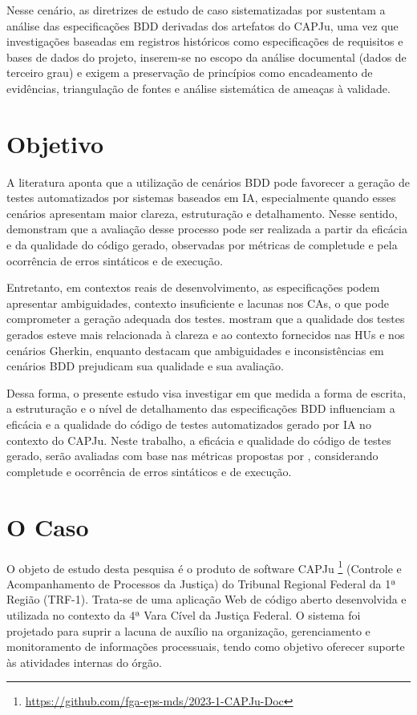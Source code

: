 Nesse cenário, as diretrizes de estudo de caso sistematizadas por  sustentam a análise das especificações BDD derivadas dos artefatos do CAPJu, uma vez que investigações baseadas em registros históricos como especificações de requisitos e bases de dados do projeto, inserem-se no escopo da análise documental (dados de terceiro grau) e exigem a preservação de princípios como encadeamento de evidências, triangulação de fontes e análise sistemática de ameaças à validade.

\section{Objetivo}

A literatura aponta que a utilização de cenários BDD pode favorecer a geração de testes automatizados por sistemas baseados em IA, especialmente quando esses cenários apresentam maior clareza, estruturação e detalhamento. Nesse sentido,  demonstram que a avaliação desse processo pode ser realizada a partir da eficácia e da qualidade do código gerado, observadas por métricas de completude e pela ocorrência de erros sintáticos e de execução.

Entretanto, em contextos reais de desenvolvimento, as especificações podem apresentar ambiguidades, contexto insuficiente e lacunas nos CAs, o que pode comprometer a geração adequada dos testes.  mostram que a qualidade dos testes gerados esteve mais relacionada à clareza e ao contexto fornecidos nas HUs e nos cenários Gherkin, enquanto  destacam que ambiguidades e inconsistências em cenários BDD prejudicam sua qualidade e sua avaliação.

Dessa forma, o presente estudo visa investigar em que medida a forma de escrita, a estruturação e o nível de detalhamento das especificações BDD influenciam a eficácia e a qualidade do código de testes automatizados gerado por IA no contexto do CAPJu. Neste trabalho, a eficácia e qualidade do código de testes gerado, serão avaliadas com base nas métricas propostas por , considerando completude e  ocorrência de erros sintáticos e de execução.

\section{O Caso}
\label{sec:caso}

O objeto de estudo desta pesquisa é o produto de software CAPJu \footnote{\url{https://github.com/fga-eps-mds/2023-1-CAPJu-Doc}} (Controle e Acompanhamento de Processos da Justiça) do Tribunal Regional Federal da 1ª Região (TRF-1). Trata-se de uma aplicação Web de código aberto desenvolvida e utilizada no contexto da 4ª Vara Cível da Justiça Federal. O sistema foi projetado para suprir a lacuna de auxílio na organização, gerenciamento e monitoramento de informações processuais, tendo como objetivo oferecer suporte às atividades internas do órgão. 


